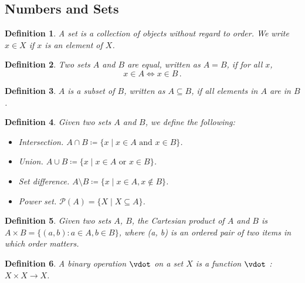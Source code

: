 \documentclass{article}
\theoremstyle{plain}\theoremheaderfont{\normalfont\itshape}\theorembodyfont{\rmfamily}\theoremseparator{.}\newtheorem*{rem}{Remark}\newtheorem*{ex}{Example}\newtheorem*{proof}{Proof}\newtheorem*{altp}{Alternative proof}
\theoremstyle{plain}\theoremheaderfont{\normalfont\bfseries}\theorembodyfont{\rmfamily}\theoremseparator{.}\newtheorem{thm}{Theorem}[section]\newtheorem{lem}[thm]{Lemma}\newtheorem{prop}[thm]{Proposition}\newtheorem*{cor}{Corollary}\newtheorem{defn}[thm]{Definition}\newtheorem{clm}[thm]{Claim}\newtheorem{clminproof}{Claim}
\theoremstyle{break}\theoremheaderfont{\normalfont\itshape}\theorembodyfont{\rmfamily}\theoremseparator{.\medskip}\newtheorem*{proofskip}{Proof}\newtheorem*{exs}{Examples}\newtheorem*{rems}{Remarks}
\theoremstyle{break}\theoremheaderfont{\normalfont\bfseries}\theorembodyfont{\rmfamily}\theoremseparator{.\medskip}\newtheorem{lemskip}[thm]{Lemma}\newtheorem{defnskip}[thm]{Definition}\newtheorem{propskip}[thm]{Proposition}\newtheorem{thmskip}[thm]{Theorem}
\numberwithin{equation}{section}
\begin{document}
	\subsection{Numbers and Sets}
	\begin{defn}
		A \textit{set} is a collection of objects without regard to order. We write \(x\in X\) if \(x\) is an element of \(X\). 
	\end{defn}
	\begin{defn}
		Two sets \(A\) and \(B\) are \textit{equal}, written as \(A = B\), if for all \(x\),
		\[x\in A \iff x \in B\,.\]
	\end{defn}
	\begin{defn}
		\(A\) is a \textit{subset} of \(B\), written as \(A\subseteq B\), if all elements in \(A\) are in \(B\).
	\end{defn}
	\begin{defn}
		Given two sets \(A\) and \(B\), we define the following:
		\begin{itemize}[topsep=0pt]
			\item \textit{Intersection.} \(A\cap B\coloneqq\{x\mid x\in A\text{ and }x\in B\}\).
			\item \textit{Union.} \(A\cup B\coloneqq\{x\mid x\in A\text{ or }x\in B\}\).
			\item \textit{Set difference.} \(A\setminus B\coloneqq\{x\mid x\in A,x\notin B\}\).
			\item \textit{Power set.} \(\mathcal{P}(A)=\{X\mid X\subseteq A\}\).
		\end{itemize}
	\end{defn}
	\begin{defn}
		Given two sets \(A\), \(B\), the \textit{Cartesian product} of \(A\) and \(B\) is \(A \times B=\{(a, b) : a\in A, b\in B\}\), where (a, b) is an \textit{ordered pair} of two items in which
		order matters.
	\end{defn}
	\begin{defn}
		A \textit{binary operation} \(\vdot\) on a set \(X\) is a function \(\vdot\) : \(X\times X\to X\).
	\end{defn}
\end{document}
